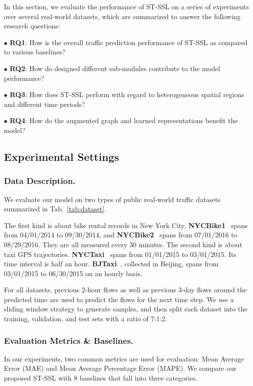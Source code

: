 \documentclass[letterpaper]{article} \usepackage{aaai23}  \usepackage{times}  \usepackage{helvet}  \usepackage{courier}  \usepackage[hyphens]{url}  \usepackage{graphicx} \urlstyle{rm} \def\UrlFont{\rm}  \usepackage{natbib}  \usepackage{caption} \frenchspacing  \setlength{\pdfpagewidth}{8.5in} \setlength{\pdfpageheight}{11in}
\newcommand{\bitem}[1]{\noindent$\bullet$ \textbf{#1}}
\newcommand{\name}{ST-SSL\xspace}
\newcommand{\tableautorefname}{Tab.}
\begin{document}
In this section, we evaluate the performance of \name on a series of experiments over several real-world datasets, which are summarized to answer the following research questions:

\bitem{RQ1}: How is the overall traffic prediction performance of \name as compared to various baselines?

\bitem{RQ2}: How do designed different sub-modules contribute to the model performance?

\bitem{RQ3}: How does \name perform with regard to heterogeneous spatial regions and different time periods? 

\bitem{RQ4}: How do the augmented graph and learned representations benefit the model? 


\subsection{Experimental Settings}

\subsubsection{Data Description.} We evaluate our model on two types of public real-world traffic datasets summarized in \tableautorefname~\ref{tab:dataset}.

The first kind is about bike rental records in New York City. {\bf NYCBike1}~\cite{zhang2017deep} spans from 04/01/2014 to 09/30/2014, and {\bf NYCBike2}~\cite{yao2019revisiting} spans from 07/01/2016 to 08/29/2016. They are all measured every 30 minutes. The second kind is about taxi GPS trajectories. {\bf NYCTaxi}~\cite{yao2019revisiting} spans from 01/01/2015 to 03/01/2015. Its time interval is half an hour. {\bf BJTaxi}~\cite{zhang2017deep}, collected in Beijing, spans from 03/01/2015 to 06/30/2015 on an hourly basis. 

For all datasets, previous 2-hour flows as well as previous 3-day flows around the predicted time are used to predict the flows for the next time step. We use a sliding window strategy to generate samples, and then split each dataset into the training, validation, and test sets with a ratio of 7:1:2.

\subsubsection{Evaluation Metrics \& Baselines.} In our experiments, two common metrics are used for evaluation: Mean Average Error (MAE) and Mean Average Percentage Error (MAPE). We compare our proposed \name with 8 baselines that fall into three categories. 
\end{document}
